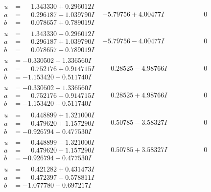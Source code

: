 \documentclass[1p]{elsarticle_modified}
\theoremstyle{definition}
\begin{document}
$$\begin{array}{c|c|c}
\begin{aligned}
u &= \phantom{-}1.343330 + 0.296012 I \\
a &= \phantom{-}0.296187 - 1.039790 I \\
b &= \phantom{-}0.078657 + 0.789019 I\end{aligned}
 & -5.79756 + 4.00477 I & \phantom{-0.000000 } 0 \\ \hline\begin{aligned}
u &= \phantom{-}1.343330 - 0.296012 I \\
a &= \phantom{-}0.296187 + 1.039790 I \\
b &= \phantom{-}0.078657 - 0.789019 I\end{aligned}
 & -5.79756 - 4.00477 I & \phantom{-0.000000 } 0 \\ \hline\begin{aligned}
u &= -0.330502 + 1.336560 I \\
a &= \phantom{-}0.752176 + 0.914715 I \\
b &= -1.153420 - 0.511740 I\end{aligned}
 & \phantom{-}0.28525 - 4.98766 I & \phantom{-0.000000 } 0 \\ \hline\begin{aligned}
u &= -0.330502 - 1.336560 I \\
a &= \phantom{-}0.752176 - 0.914715 I \\
b &= -1.153420 + 0.511740 I\end{aligned}
 & \phantom{-}0.28525 + 4.98766 I & \phantom{-0.000000 } 0 \\ \hline\begin{aligned}
u &= \phantom{-}0.448899 + 1.321000 I \\
a &= \phantom{-}0.479620 + 1.157290 I \\
b &= -0.926794 - 0.477530 I\end{aligned}
 & \phantom{-}0.50785 - 3.58327 I & \phantom{-0.000000 } 0 \\ \hline\begin{aligned}
u &= \phantom{-}0.448899 - 1.321000 I \\
a &= \phantom{-}0.479620 - 1.157290 I \\
b &= -0.926794 + 0.477530 I\end{aligned}
 & \phantom{-}0.50785 + 3.58327 I & \phantom{-0.000000 } 0 \\ \hline\begin{aligned}
u &= \phantom{-}0.421282 + 0.431473 I \\
a &= \phantom{-}0.472397 - 0.578811 I \\
b &= -1.077780 + 0.697217 I\end{aligned}

\end{array}$$
\end{document}
